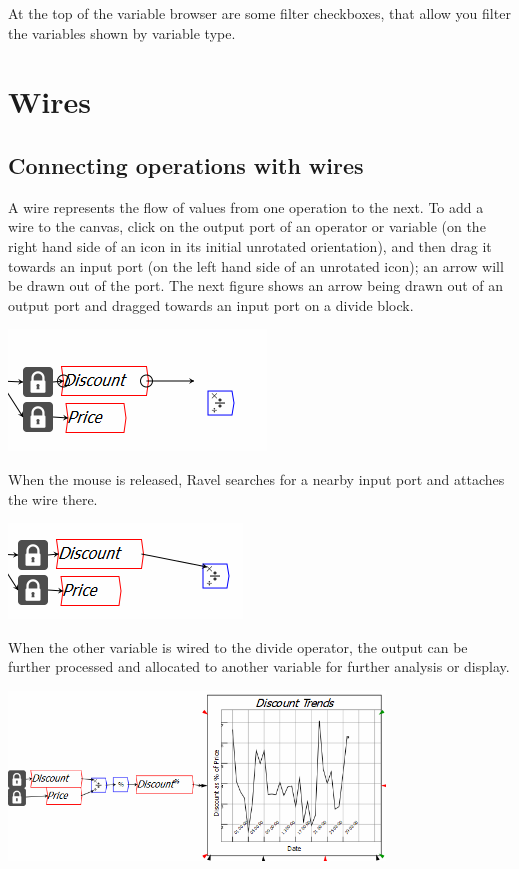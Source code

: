 At the top of the variable browser are some filter checkboxes, that
allow you filter the variables shown by variable type.

\section{Wires}

\label{Wires}

\subsection{Connecting operations with wires}

A wire represents the flow of values from one operation to the next.
To add a wire to the canvas, click on the output port of an operator
or variable (on the right hand side of an icon in its initial unrotated
orientation), and then drag it towards an input port (on the left
hand side of an unrotated icon); an arrow will be drawn out of the
port. The next figure shows an arrow being drawn out of an output
port and dragged towards an input port on a divide block.

\includegraphics{images/ArrowDrawing01}

When the mouse is released, Ravel searches for a nearby input port
and attaches the wire there.

\includegraphics{images/ArrowDrawing02}

When the other variable is wired to the divide operator, the output
can be further processed and allocated to another variable for further
analysis or display.

\includegraphics[width=10cm]{images/ArrowDrawing03}

